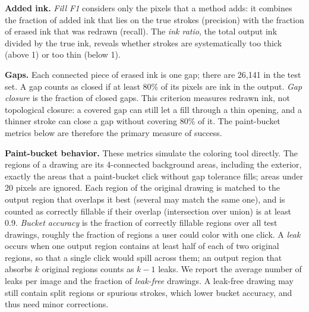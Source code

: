 \documentclass{IEEEcsmag}
\providecommand{\DIFaddtex}[1]{{\color{blue}#1}} %
\providecommand{\DIFdeltex}[1]{} %
\providecommand{\DIFaddbegin}{} %
\providecommand{\DIFaddend}{} %
\providecommand{\DIFdelbegin}{} %
\providecommand{\DIFdelend}{} %
\providecommand{\DIFaddtex}[1]{\DIFaddtex{#1}} %
\providecommand{\DIFdeltex}[1]{\DIFdeltex{#1}} %
\providecommand{\DIFaddbegin}{} %
\providecommand{\DIFadd}[1]{\texorpdfstring{\DIFaddtex{#1}}{#1}} %
\providecommand{\DIFdel}[1]{\texorpdfstring{\DIFdeltex{#1}}{}} %
\begin{document}
\textbf{Added ink.} \emph{Fill F1} considers only the pixels that a method adds: it
combines the fraction of added ink that lies on the true strokes (precision) with the
fraction of erased ink that was redrawn (recall). The \emph{ink ratio}, the total
output ink divided by the true ink, reveals whether strokes are systematically too
thick (above 1) or too thin (below 1).

\textbf{Gaps.} Each connected piece of erased ink is one gap; there are 26,141 in the
test set. A gap counts as closed if at least 80\% of its pixels are ink in the
output. \emph{Gap closure} is the fraction of closed gaps. \DIFaddbegin \DIFadd{This criterion measures
redrawn ink, not topological closure: a covered gap can still let a fill through a
thin opening, and a thinner stroke can close a gap without covering 80\% of it. The
paint-bucket metrics below are therefore the primary measure of success.
}\DIFaddend 

\textbf{Paint-bucket behavior.} These metrics simulate the coloring tool directly.
\DIFaddbegin \DIFadd{The regions of a drawing are its 4-connected background areas, including the
exterior, exactly the areas that a paint-bucket click without gap tolerance fills;
areas under 20 pixels are ignored. }\DIFaddend Each region of the original drawing is matched to
the output region that overlaps it best \DIFaddbegin \DIFadd{(several may match the same one)}\DIFaddend , and is counted as correctly fillable if their overlap (intersection over
union) is at least 0.9. \emph{Bucket accuracy} is the fraction of correctly fillable
regions \DIFaddbegin \DIFadd{over all test drawings}\DIFaddend , roughly the fraction of regions a user could color with one click. A
\emph{leak} occurs when one output region \DIFdelbegin \DIFdel{swallows most of }\DIFdelend \DIFaddbegin \DIFadd{contains at least half of each of }\DIFaddend two
original regions, so that a single click would spill across them\DIFaddbegin \DIFadd{; an output region
that absorbs $k$ original regions counts as $k-1$ leaks}\DIFaddend . We report the average
number of leaks per image and the fraction of \emph{leak-free} drawings\DIFdelbegin \DIFdel{, which are ready to color
without any manual correction}\DIFdelend \DIFaddbegin \DIFadd{. A leak-free
drawing may still contain split regions or spurious strokes, which lower bucket
accuracy, and thus need minor corrections}\DIFaddend .
\end{document}
